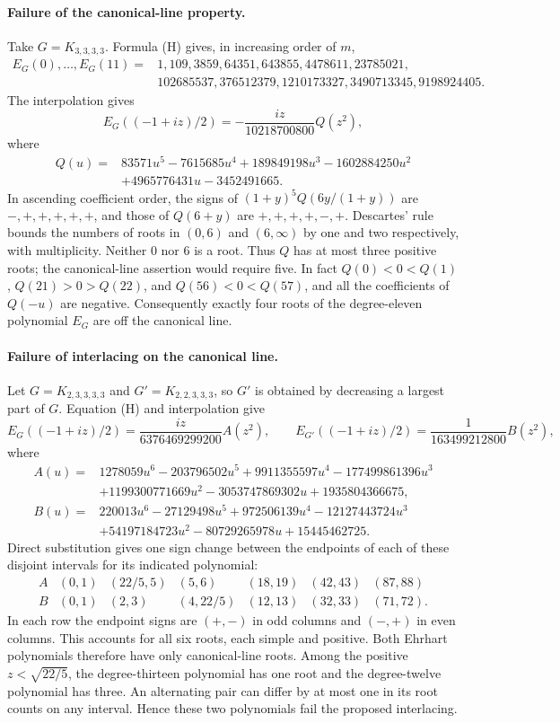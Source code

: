 \documentclass[11pt,a4paper]{article}
\theoremstyle{definition}\newtheorem{problem}[theorem]{Problem}
\begin{document}
\paragraph{Failure of the canonical-line property.}
Take $G=K_{3,3,3,3}$. Formula (H) gives, in increasing order of $m$,
\begin{align*}
 E_G(0),\ldots,E_G(11)={}&1,109,3859,64351,643855,4478611,23785021,\\
                         &102685537,376512379,1210173327,3490713345,9198924405.
\end{align*}
The interpolation gives
\[
 E_G((-1+iz)/2)=-\frac{iz}{10218700800}Q(z^2),
\]
where
\begin{align*}
 Q(u)={}&83571u^5-7615685u^4+189849198u^3-1602884250u^2\\
       &+4965776431u-3452491665 .
\end{align*}
In ascending coefficient order, the signs of
$(1+y)^5Q(6y/(1+y))$ are $-,+,+,+,+,+$, and those of $Q(6+y)$
are $+,+,+,+,-,+$. Descartes' rule bounds the numbers of roots in
$(0,6)$ and $(6,\infty)$ by one and two respectively, with multiplicity.
Neither $0$ nor $6$ is a root. Thus $Q$ has at most three positive
roots; the canonical-line assertion would require five. In fact
$Q(0)<0<Q(1)$, $Q(21)>0>Q(22)$, and $Q(56)<0<Q(57)$,
and all the coefficients of $Q(-u)$ are negative. Consequently
exactly four roots of the degree-eleven polynomial $E_G$ are off
the canonical line.

\paragraph{Failure of interlacing on the canonical line.}
Let $G=K_{2,3,3,3,3}$ and $G'=K_{2,2,3,3,3}$, so $G'$ is obtained
by decreasing a largest part of $G$. Equation (H) and interpolation give
\[
 E_G((-1+iz)/2)=\frac{iz}{6376469299200}A(z^2),\qquad
 E_{G'}((-1+iz)/2)=\frac{1}{163499212800}B(z^2),
\]
where
\begin{align*}
 A(u)={}&1278059u^6-203796502u^5+9911355597u^4-177499861396u^3\\
       &+1199300771669u^2-3053747869302u+1935804366675,\\
 B(u)={}&220013u^6-27129498u^5+972506139u^4-12127443724u^3\\
       &+54197184723u^2-80729265978u+15445462725 .
\end{align*}
Direct substitution gives one sign change between the endpoints of each
of these disjoint intervals for its indicated polynomial:
\[
\begin{array}{c|rrrrrr}
 A &(0,1)&(22/5,5)&(5,6)&(18,19)&(42,43)&(87,88)\\
 B &(0,1)&(2,3)&(4,22/5)&(12,13)&(32,33)&(71,72).
\end{array}
\]
In each row the endpoint signs are $(+,-)$ in odd columns and $(-,+)$ in even columns. This accounts for
all six roots, each simple and positive. Both Ehrhart polynomials
therefore have only canonical-line roots. Among the positive
$z<\sqrt{22/5}$, the degree-thirteen polynomial has one root
and the degree-twelve polynomial has three. An alternating pair
can differ by at most one in its root counts on any interval. Hence
these two polynomials fail the proposed interlacing.
\end{document}
